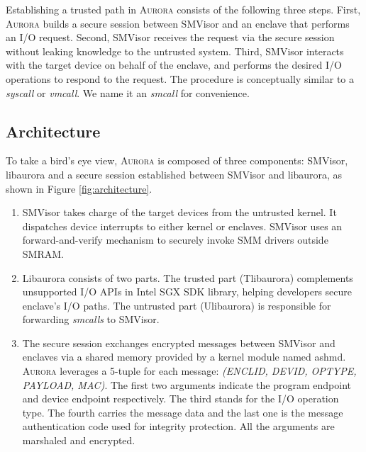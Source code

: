 Establishing a trusted path in \textsc{Aurora} consists of the following three steps. First, \textsc{Aurora} builds a secure session between SMVisor and an enclave that performs an I/O request. Second, SMVisor receives the request via the secure session without leaking knowledge to the untrusted system. Third, SMVisor interacts with the target device on behalf of the enclave, and performs the desired I/O operations to respond to the request. The procedure is conceptually similar to a \textit{syscall} or \textit{vmcall}. We name it an \textit{smcall} for convenience.

\subsection{Architecture}\label{arch}

To take a bird's eye view, \textsc{Aurora} is composed of three components: SMVisor, libaurora and a secure session established between SMVisor and libaurora, as shown in Figure \ref{fig:architecture}.

\begin{enumerate}%
\item SMVisor takes charge of the target devices from the untrusted kernel. It dispatches device interrupts to either kernel or enclaves. SMVisor uses an forward-and-verify mechanism to securely invoke SMM drivers outside SMRAM.
\item Libaurora consists of two parts. The trusted part (Tlibaurora) complements unsupported I/O APIs in Intel SGX SDK library, helping developers secure enclave's I/O paths. The untrusted part (Ulibaurora) is responsible for forwarding \textit{smcalls} to SMVisor.  %
\item The secure session exchanges encrypted messages between SMVisor and enclaves via a shared memory provided by a kernel module named ashmd.  \textsc{Aurora} leverages a 5-tuple for each message: \textit{(ENCLID, DEVID, OPTYPE, PAYLOAD, MAC)}. The first two arguments indicate the program endpoint and device endpoint respectively.  The third stands for the I/O operation type. The fourth carries the message data and the last one is the message authentication code used for integrity protection. All the arguments are marshaled and encrypted. 

\end{enumerate}

